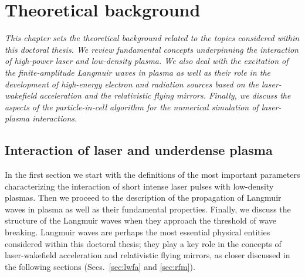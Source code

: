 \documentclass[10pt, a4paper, twoside, openright]{report}
\begin{document}


\chapter{Theoretical background\label{chap:theoretical_background}}

\noindent \textsl{This chapter sets the theoretical background related to the topics considered within this doctoral thesis. We review fundamental concepts underpinning the interaction of high-power laser and low-density plasma. We also deal with the excitation of the finite-amplitude Langmuir waves in plasma as well as their role in the development of high-energy electron and radiation sources based on the laser-wakefield acceleration and the relativistic flying mirrors. Finally, we discuss the aspects of the particle-in-cell algorithm for the numerical simulation of laser-plasma interactions.}

\section{Interaction of laser and underdense plasma}

In the first section we start with the definitions of the most important parameters characterizing the interaction of short intense laser pulses with low-density plasmas. Then we proceed to the description of the propagation of Langmuir waves in plasma as well as their fundamental properties. Finally, we discuss the structure of the Langmuir waves when they approach the threshold of wave breaking. Langmuir waves are perhaps the most essential physical entities considered within this doctoral thesis; they play a key role in the concepts of laser-wakefield acceleration and relativistic flying mirrors, as closer discussed in the following sections (Secs.~\ref{sec:lwfa} and \ref{sec:rfm}). 

\end{document}
